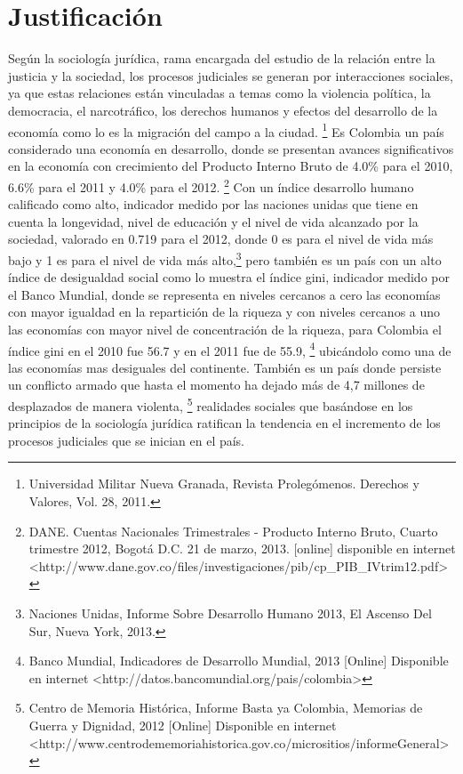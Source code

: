 \chapter{Justificaci\'on}
\label{sec:justificacion}
Seg\'un la sociolog\'ia jur\'idica, rama encargada del estudio de la relaci\'on
entre la justicia y la sociedad, los procesos judiciales se generan por
interacciones sociales, ya que estas relaciones est\'an vinculadas a temas
como la violencia pol\'itica, la democracia, el narcotr\'afico, los derechos
humanos y efectos del desarrollo de la econom\'ia como lo es la migraci\'on
del campo a la ciudad. \footnote{Universidad Militar Nueva Granada, Revista Prolegómenos. Derechos y Valores, Vol. 28, 2011.} 
Es Colombia un pa\'is considerado una econom\'ia en desarrollo, donde se presentan
avances significativos en la econom\'ia con crecimiento del Producto 
Interno Bruto de 4.0\% para el 2010, 6.6\% para el 2011 y 4.0\% para el 2012. 
\footnote{DANE. Cuentas Nacionales Trimestrales - Producto Interno Bruto, Cuarto trimestre 2012, Bogotá D.C. 21 de marzo, 2013. [online]  disponible en internet \textless  http://www.dane.gov.co/files/investigaciones/pib/cp_PIB_IVtrim12.pdf\textgreater} 
Con un \'indice desarrollo humano calificado como alto, indicador medido 
por las naciones unidas que tiene en cuenta la longevidad, nivel de 
educaci\'on y el nivel de vida alcanzado por la sociedad, valorado en 
0.719 para el 2012, donde 0 es para el nivel de vida m\'as bajo y 1 es 
para el nivel de vida m\'as alto,\footnote{Naciones Unidas, Informe Sobre Desarrollo Humano 2013, El Ascenso Del Sur, Nueva York, 2013.}  pero tambi\'en es un pa\'is con
un alto \'indice de desigualdad social como lo muestra el \'indice gini, 
indicador medido por el Banco Mundial, donde se representa en niveles 
cercanos a cero las econom\'ias con mayor igualdad en la repartici\'on de 
la riqueza y con niveles cercanos a uno las econom\'ias con mayor nivel 
de concentraci\'on de la riqueza, para Colombia el \'indice gini en el 2010 
fue 56.7 y en el 2011 fue de 55.9, \footnote{Banco Mundial, Indicadores de Desarrollo Mundial, 2013 [Online] Disponible en internet \textless  http://datos.bancomundial.org/pais/colombia\textgreater} ubic\'andolo como 
una de las econom\'ias mas desiguales del continente. Tambi\'en es un pa\'is 
donde persiste un conflicto armado que hasta el momento ha dejado m\'as 
de 4,7 millones de desplazados de manera violenta,
\footnote{Centro de Memoria Histórica, Informe Basta ya Colombia, Memorias de Guerra y Dignidad, 2012 [Online] Disponible en internet \textless http://www.centrodememoriahistorica.gov.co/micrositios/informeGeneral\textgreater} 
realidades sociales que bas\'andose en los principios de la sociolog\'ia 
jur\'idica ratifican la tendencia en el incremento de los procesos 
judiciales que se inician en el pa\'is.
